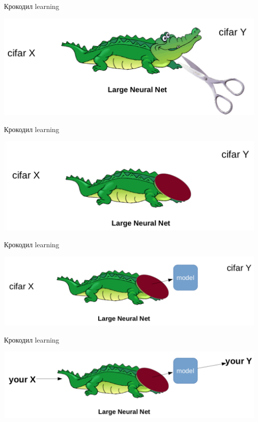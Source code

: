 \documentclass[notes,12pt, aspectratio=169]{beamer}
\begin{document}
\begin{frame}{Крокодил learning}
\begin{center}
	\includegraphics[width=.8\linewidth]{croc_2.png}
\end{center}
\end{frame}

\begin{frame}{Крокодил learning}
\begin{center}
	\includegraphics[width=.8\linewidth]{croc_3.png}
\end{center}
\end{frame}

\begin{frame}{Крокодил learning}
\begin{center}
	\includegraphics[width=.8\linewidth]{croc_4.png}
\end{center}
\end{frame}

\begin{frame}{Крокодил learning}
\begin{center}
	\includegraphics[width=.8\linewidth]{croc_5.png}
\end{center}
\end{frame}
\end{document}
